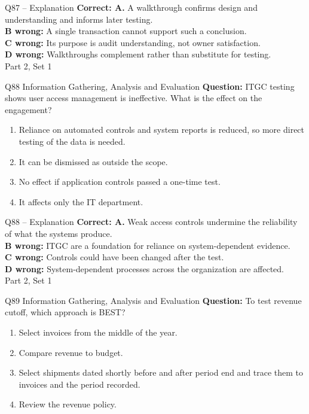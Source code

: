 \documentclass[aspectratio=169,10pt]{beamer}
\begin{document}
\begin{frame}[t]{Q87 -- Explanation}
	\footnotesize
	\textbf{Correct: A.} A walkthrough confirms design and understanding and informs later testing. \\[5pt]
\textbf{B wrong:} A single transaction cannot support such a conclusion. \\[3pt]
\textbf{C wrong:} Its purpose is audit understanding, not owner satisfaction. \\[3pt]
\textbf{D wrong:} Walkthroughs complement rather than substitute for testing. \\[3pt]
	\vfill {\tiny Part 2, Set 1}
\end{frame}
\begin{frame}[t]{Q88 \hfill {\scriptsize Information Gathering, Analysis and Evaluation}}
	\small
	\textbf{Question:} ITGC testing shows user access management is ineffective. What is the effect on the engagement?
	\begin{enumerate}[label=\Alph*.,itemsep=1pt,topsep=3pt]
			\item Reliance on automated controls and system reports is reduced, so more direct testing of the data is needed.
			\item It can be dismissed as outside the scope.
			\item No effect if application controls passed a one-time test.
			\item It affects only the IT department.
	\end{enumerate}
\end{frame}
\begin{frame}[t]{Q88 -- Explanation}
	\footnotesize
	\textbf{Correct: A.} Weak access controls undermine the reliability of what the systems produce. \\[5pt]
\textbf{B wrong:} ITGC are a foundation for reliance on system-dependent evidence. \\[3pt]
\textbf{C wrong:} Controls could have been changed after the test. \\[3pt]
\textbf{D wrong:} System-dependent processes across the organization are affected. \\[3pt]
	\vfill {\tiny Part 2, Set 1}
\end{frame}
\begin{frame}[t]{Q89 \hfill {\scriptsize Information Gathering, Analysis and Evaluation}}
	\small
	\textbf{Question:} To test revenue cutoff, which approach is BEST?
	\begin{enumerate}[label=\Alph*.,itemsep=1pt,topsep=3pt]
			\item Select invoices from the middle of the year.
			\item Compare revenue to budget.
			\item Select shipments dated shortly before and after period end and trace them to invoices and the period recorded.
			\item Review the revenue policy.
	\end{enumerate}
\end{frame}
\end{document}
